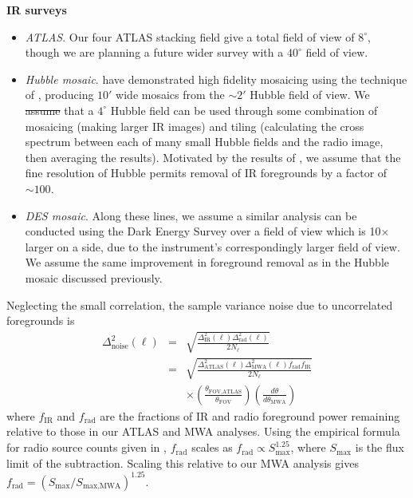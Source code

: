 \documentclass[numberedappendix]{emulateapj}
\newcommand{\rad}{\text{rad}}
\newcommand{\IR}{\text{IR}}
\newcommand{\ir}{\text{IR}}
\newcommand{\fov}{\text{FOV}}
\providecommand{\DIFadd}[1]{{\protect\color{blue}\uwave{#1}}} %
\providecommand{\DIFdel}[1]{{\protect\color{red}\sout{#1}}}                      %
\providecommand{\DIFaddbegin}{} %
\providecommand{\DIFaddend}{} %
\providecommand{\DIFdelbegin}{} %
\providecommand{\DIFdelend}{} %
\begin{document}
\noindent\textbf{IR surveys}
\begin{itemize}
\item \textit{ATLAS}. Our four ATLAS stacking field give a total field of view of $8^\circ$, though we are planning a future wider survey with a $40^\circ$ field of view. 
\item \textit{Hubble mosaic}. \citet{mw15} have demonstrated high fidelity mosaicing using the technique of \citet{fixen00}, producing $10'$ wide mosaics from the $\sim2'$ Hubble field of view. We \DIFdelbegin \DIFdel{assume }\DIFdelend \DIFaddbegin \DIFadd{make the liberal assumption }\DIFaddend that a $4^\circ$ Hubble field can be used through some combination of mosaicing (making larger IR images) and tiling (calculating the cross spectrum between each of many small Hubble fields and the radio image, then averaging the results). Motivated by the results of \citet{mw15}, we assume that the fine resolution of Hubble permits removal of IR foregrounds by a factor of $\sim100$.
\item \textit{DES mosaic}. Along these lines, we assume a similar analysis can be conducted using the Dark Energy Survey\citet{des16} over a field of view which is 10$\times$ larger on a side, due to the instrument's correspondingly larger field of view. We assume the same improvement in foreground removal as in the Hubble mosaic discussed previously.
\end{itemize}

Neglecting the small correlation, the sample variance noise due to uncorrelated foregrounds is
\begin{eqnarray}
\Delta^2_\text{noise}(\ell) &=& \sqrt{\frac{\Delta^2_\IR(\ell) \Delta^2_\rad(\ell)}{2N_\ell}} \nonumber \\
&=&\sqrt{\frac{\Delta^2_{\text{ATLAS}}(\ell) \Delta^2_{\text{MWA}}(\ell)f_\rad f_\ir}{2N_\ell}} \nonumber \\
&&\times \left( \frac{\theta_{\fov,\text{ATLAS}}}{\theta_\fov}\right)\left(\frac{d\theta}{d\theta_{\text{MWA}}}\right)
\end{eqnarray}
where $f_\ir$ and $f_\rad$ are the fractions of IR and radio foreground power remaining relative to those in our ATLAS and MWA analyses. Using the empirical formula for radio source counts given in \citet{dimatteo02}, $f_\rad$ scales as $f_\rad\propto S_\text{max}^{1.25}$, where $S_\text{max}$ is the flux limit of the subtraction. Scaling this relative to our MWA analysis gives $f_\rad=(S_\text{max}/S_{\text{max},\text{MWA}})^{1.25}$.
\end{document}

